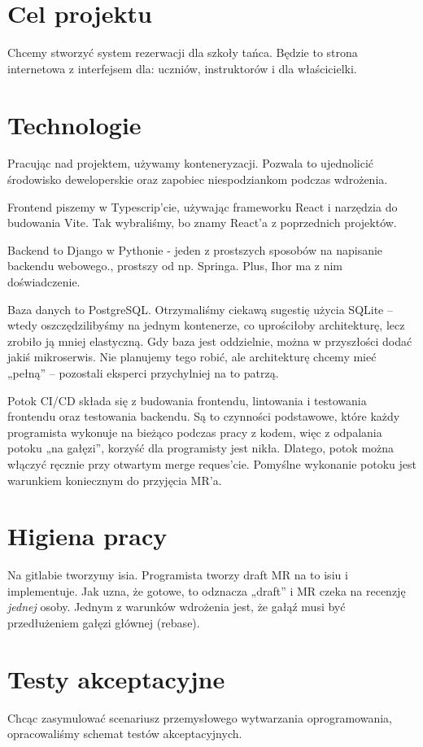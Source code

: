 \documentclass[12pt, a4paper]{article}
\begin{document}
\pagestyle{myheadings}

\section{Cel projektu}
Chcemy stworzyć system rezerwacji dla szkoły tańca. Będzie to strona internetowa
z interfejsem dla: uczniów, instruktorów i dla właścicielki.

\section{Technologie}
Pracując nad projektem, używamy konteneryzacji. Pozwala to ujednolicić środowisko
deweloperskie oraz zapobiec niespodziankom podczas wdrożenia.

Frontend piszemy w Typescrip'cie, używając frameworku React i narzędzia
do budowania Vite. Tak wybraliśmy, bo znamy React'a z poprzednich projektów.

Backend to Django w Pythonie - jeden z prostszych sposobów na napisanie
backendu webowego., prostszy od np. Springa. Plus, Ihor ma z nim doświadczenie.

Baza danych to PostgreSQL. Otrzymaliśmy ciekawą sugestię użycia SQLite
-- wtedy oszczędzilibyśmy na jednym kontenerze, co uprościłoby architekturę,
lecz zrobiło ją mniej elastyczną. Gdy baza jest oddzielnie, można w przyszłości
dodać jakiś mikroserwis. Nie planujemy tego robić, ale architekturę chcemy mieć
„pełną” -- pozostali eksperci przychylniej na to patrzą.

Potok CI/CD składa się z budowania frontendu, lintowania i testowania frontendu oraz
testowania backendu. Są to czynności podstawowe, które każdy programista wykonuje
na bieżąco podczas pracy z kodem, więc z odpalania potoku „na gałęzi”, korzyść
dla programisty jest nikła. Dlatego, potok można włączyć ręcznie przy otwartym
merge reques'cie. Pomyślne wykonanie potoku jest warunkiem koniecznym
do przyjęcia MR'a.

\section{Higiena pracy}
Na gitlabie tworzymy isia. Programista tworzy draft MR na to isiu i implementuje.
Jak uzna, że gotowe, to odznacza „draft” i MR czeka na recenzję \textit{jednej} osoby.
Jednym z warunków wdrożenia jest, że gałąź musi być przedłużeniem gałęzi
głównej (rebase).

\section{Testy akceptacyjne}
Chcąc zasymulować scenariusz przemysłowego wytwarzania oprogramowania,
opracowaliśmy schemat testów akceptacyjnych.
\end{document}
